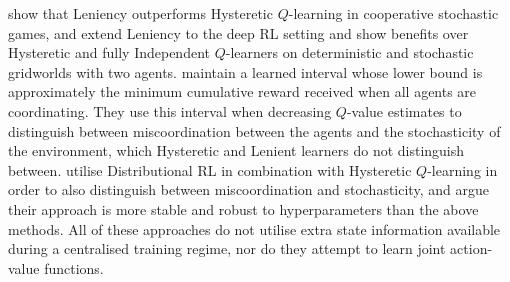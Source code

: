 \documentclass[twoside,11pt]{article}
\begin{document}
\citet{wei2016lenient} show that Leniency outperforms Hysteretic $Q$-learning in cooperative stochastic games, and \citet{palmer2018lenient} extend Leniency to the deep RL setting and show benefits over Hysteretic and fully Independent $Q$-learners on deterministic and stochastic gridworlds with two agents. 
\citet{palmer_negative_2019} maintain
a learned interval whose lower bound is approximately the minimum cumulative reward received when all agents are coordinating. They use this interval when decreasing $Q$-value estimates to distinguish between miscoordination between the agents and the stochasticity of the environment, which Hysteretic and Lenient learners do not distinguish between. 
\citet{lu2019decentralised} utilise Distributional RL \citep{bellemare2017distributional} in combination with Hysteretic $Q$-learning in order to also distinguish between miscoordination and stochasticity, and argue their approach is more stable and robust to hyperparameters than the above methods. 
All of these approaches do not utilise extra state information available during a centralised training regime, nor do they attempt to learn joint action-value functions.
\end{document}
